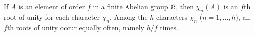 If $A$ is an element of order $f$ in a finite Abelian group $\mathfrak{G}$, then $\chi_n(A)$ is an $f$th root of unity for each character $\chi_n$. Among the $h$ characters $\chi_n$ ($n = 1, \ldots, h$), all $f$th roots of unity occur equally often, namely $h/f$ times.
